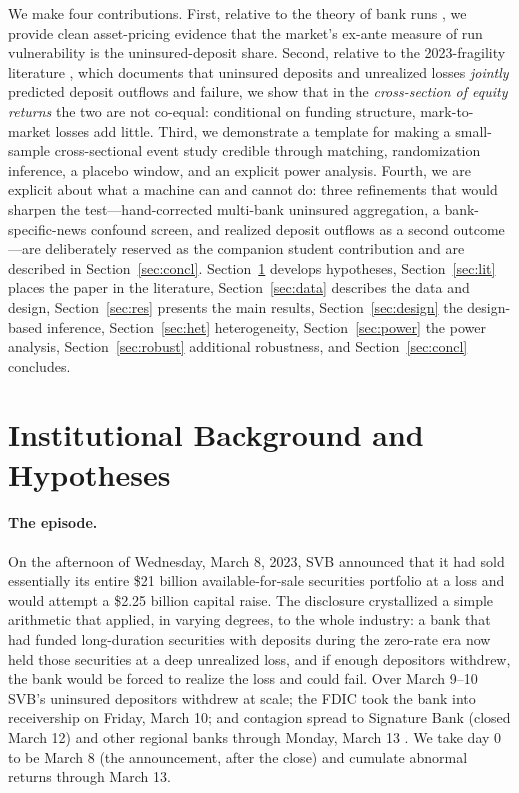 \documentclass[12pt]{article}
\begin{document}
We make four contributions. First, relative to the theory of bank runs
\citep{diamond1983,goldstein2005}, we provide clean asset-pricing evidence that the market's
ex-ante measure of run vulnerability is the uninsured-deposit share. Second, relative to the
2023-fragility literature \citep{jiang2024,metrick2024,drechsler2023}, which documents that
uninsured deposits and unrealized losses \emph{jointly} predicted deposit outflows and
failure, we show that in the \emph{cross-section of equity returns} the two are not
co-equal: conditional on funding structure, mark-to-market losses add little. Third, we
demonstrate a template for making a small-sample cross-sectional event study credible
through matching, randomization inference, a placebo window, and an explicit power analysis.
Fourth, we are explicit about what a machine can and cannot do: three refinements that would
sharpen the test---hand-corrected multi-bank uninsured aggregation, a bank-specific-news
confound screen, and realized deposit outflows as a second outcome---are deliberately
reserved as the companion student contribution and are described in Section~\ref{sec:concl}.
Section~\ref{sec:bg} develops hypotheses, Section~\ref{sec:lit} places the paper in the
literature, Section~\ref{sec:data} describes the data and design, Section~\ref{sec:res}
presents the main results, Section~\ref{sec:design} the design-based inference,
Section~\ref{sec:het} heterogeneity, Section~\ref{sec:power} the power analysis,
Section~\ref{sec:robust} additional robustness, and Section~\ref{sec:concl} concludes.

\section{Institutional Background and Hypotheses}\label{sec:bg}
\paragraph{The episode.} On the afternoon of Wednesday, March 8, 2023, SVB announced that it
had sold essentially its entire \$21 billion available-for-sale securities portfolio at a
loss and would attempt a \$2.25 billion capital raise. The disclosure crystallized a simple
arithmetic that applied, in varying degrees, to the whole industry: a bank that had funded
long-duration securities with deposits during the zero-rate era now held those securities at
a deep unrealized loss, and if enough depositors withdrew, the bank would be forced to
realize the loss and could fail. Over March 9--10 SVB's uninsured depositors withdrew at
scale; the FDIC took the bank into receivership on Friday, March 10; and contagion spread to
Signature Bank (closed March 12) and other regional banks through Monday, March 13
\citep{metrick2024}. We take day 0 to be March 8 (the announcement, after the close) and
cumulate abnormal returns through March 13.
\end{document}
